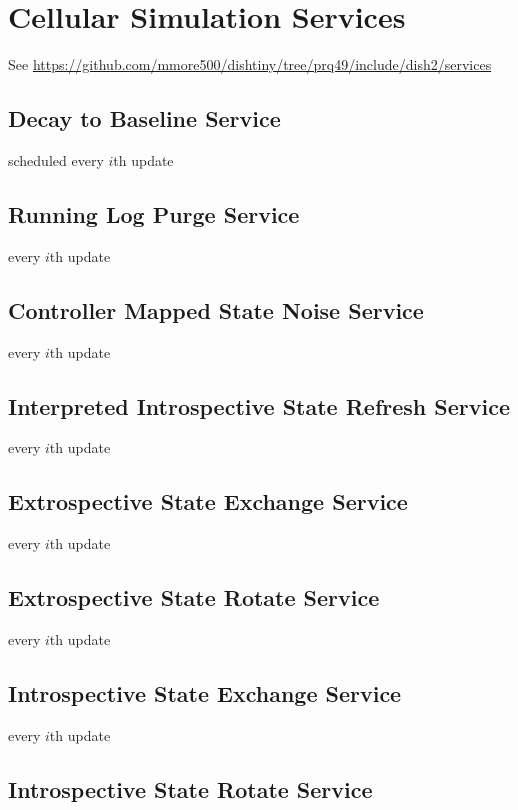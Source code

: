 \section{Cellular Simulation Services}

See \url{https://github.com/mmore500/dishtiny/tree/prq49/include/dish2/services}

\subsection{Decay to Baseline Service}

scheduled every $i$th update

\subsection{Running Log Purge Service}

every $i$th update

\subsection{Controller Mapped State Noise Service}

every $i$th update

\subsection{Interpreted Introspective State Refresh Service}

every $i$th update

\subsection{Extrospective State Exchange Service}

every $i$th update

\subsection{Extrospective State Rotate Service}

every $i$th update

\subsection{Introspective State Exchange Service}

every $i$th update

\subsection{Introspective State Rotate Service}

